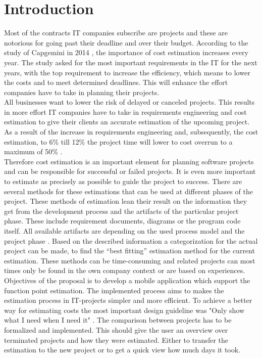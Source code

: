 \chapter{Introduction}

Most of the contracts IT companies subscribe are projects and these are notorious for going past their deadline and over their budget. According to the study of Capgemini in 2014 \cite{capgemini}, the importance of cost estimation increases every year. The study asked for the most important requirements in the IT for the next years, with the top requirement to increase the efficiency, which means to lower the costs and to meet determined deadlines. This will enhance the effort companies have to take in planning their projects.\\
All businesses want to lower the risk of delayed or canceled projects. This results in more effort IT companies have to take in requirements engineering and cost estimation to give their clients an accurate estimation of the upcoming project. As a result of the increase in requirements engineering and, subsequently, the cost estimation, to 6\% till 12\% the project time will lower to cost overrun to a maximum of 50\% \cite{Partsch}.\\
Therefore cost estimation is an important element for planning software projects and can be responsible for successful or failed projects. It is even more important to estimate as precisely as possible to guide the project to success. There are several methods for these estimations that can be used at different phases of the project. These methods of estimation lean their result on the information they get from the development process and the artifacts of the particular project phase. These include requirement documents, diagrams or the program code itself. All available artifacts are depending on the used process model and the project phase \cite{EntwicklungKompakt}. Based on the described information a categorization for the actual project can be made, to find the “best fitting” estimation method for the current estimation. These methods can be time-consuming and related projects can most times only be found in the own company context or are based on experiences.\\
Objectives of the proposal is to develop a mobile application which support the function point estimation. The implemented process aims to makes the estimation process in IT-projects simpler and more efficient. To achieve a better way for estimating costs the most important design guideline was "Only show what I need when I need it" \cite{materialdesign}. The comparison between projects has to be formalized and implemented. This should give the user an overview over terminated projects and how they were estimated. Either to transfer the estimation to the new project or to get a quick view how much days it took.\\
